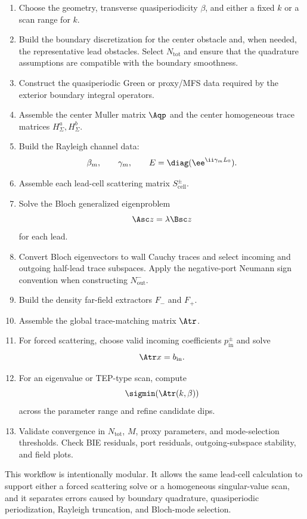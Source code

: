 \begin{enumerate}
  \item Choose the geometry, transverse quasiperiodicity \(\beta\), and either a
  fixed \(k\) or a scan range for \(k\).

  \item Build the boundary discretization for the center obstacle and, when
  needed, the representative lead obstacles.  Select \(N_{\mathrm{tot}}\) and
  ensure that the quadrature assumptions are compatible with the boundary
  smoothness.

  \item Construct the quasiperiodic Green or proxy/MFS data required by the
  exterior boundary integral operators.

  \item Assemble the center Muller matrix \(\Aqp\) and the center homogeneous
  trace matrices \(H_\Sigma^a,H_\Sigma^b\).

  \item Build the Rayleigh channel data:
  \[
    \beta_m,\qquad \gamma_m,\qquad E=\diag(\ee^{\ii\gamma_mL_0}).
  \]

  \item Assemble each lead-cell scattering matrix \(S_{\mathrm{cell}}^\pm\).

  \item Solve the Bloch generalized eigenproblem
  \[
    \Asc z=\lambda\Bsc z
  \]
  for each lead.

  \item Convert Bloch eigenvectors to wall Cauchy traces and select incoming and
  outgoing half-lead trace subspaces.  Apply the negative-port Neumann sign
  convention when constructing \(N_{\mathrm{out}}^-\).

  \item Build the density far-field extractors \(F_-\) and \(F_+\).

  \item Assemble the global trace-matching matrix \(\Atr\).

  \item For forced scattering, choose valid incoming coefficients
  \(p_{\mathrm{in}}^\pm\) and solve
  \[
    \Atr x=b_{\mathrm{in}} .
  \]

  \item For an eigenvalue or TEP-type scan, compute
  \[
    \sigmin(\Atr(k,\beta))
  \]
  across the parameter range and refine candidate dips.

  \item Validate convergence in \(N_{\mathrm{tot}}\), \(M\), proxy parameters,
  and mode-selection thresholds.  Check BIE residuals, port residuals,
  outgoing-subspace stability, and field plots.
\end{enumerate}

This workflow is intentionally modular.  It allows the same lead-cell
calculation to support either a forced scattering solve or a homogeneous
singular-value scan, and it separates errors caused by boundary quadrature,
quasiperiodic periodization, Rayleigh truncation, and Bloch-mode selection.
